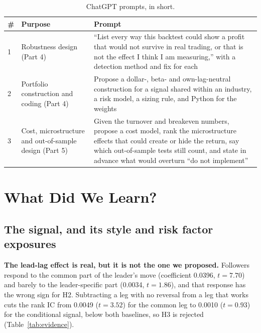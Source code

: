 \documentclass[11pt,letterpaper]{article}
\begin{document}
\begin{table}[h]
\centering\small
\caption{ChatGPT prompts, in short.}\label{tab:prompts}
\begin{tabularx}{\textwidth}{@{}l>{\raggedright\arraybackslash}p{}Y@{}}
\toprule
\# & Purpose & Prompt \\
 & Robustness design (Part 4) & ``List every way this backtest could show a profit that would not survive in real trading, or that is not the effect I think I am measuring,'' with a detection method and fix for each \\
2 & Portfolio construction and coding (Part 4) & Propose a dollar-, beta- and own-lag-neutral construction for a signal shared within an industry, a risk model, a sizing rule, and Python for the weights \\
3 & Cost, microstructure and out-of-sample design (Part 5) & Given the turnover and breakeven numbers, propose a cost model, rank the microstructure effects that could create or hide the return, say which out-of-sample tests still count, and state in advance what would overturn ``do not implement'' \\
\bottomrule
\end{tabularx}
\end{table}

\section{What Did We Learn?}

\subsection{The signal, and its style and risk factor exposures}

\textbf{The lead-lag effect is real, but it is not the one we proposed.}
Followers respond to the common part of the leader's move (coefficient 0.0396,
$t = 7.70$) and barely to the leader-specific part (0.0034, $t = 1.86$), and
that response has the wrong sign for H2. Subtracting a leg with no reversal
from a leg that works cuts the rank IC from 0.0049 ($t = 3.52$) for the common
leg to 0.0010 ($t = 0.93$) for the conditional signal, below both baselines, so
H3 is rejected (Table~\ref{tab:evidence}).
\end{document}
